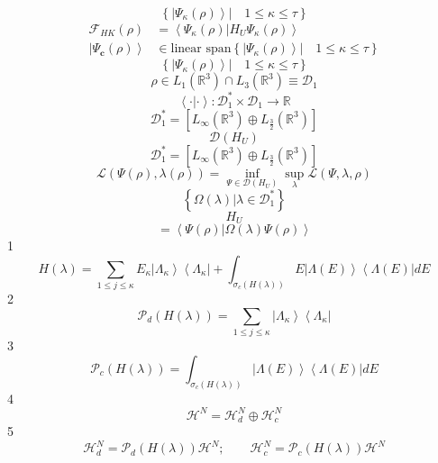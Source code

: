\documentclass[prl,twocolumn]{revtex4}%
\begin{document}
\[
\left\{  \left.  \left\vert \Psi_{\kappa}\left(  \rho\right)  \right\rangle
\right\vert \quad1\leq\kappa\leq\tau\right\}
\]%
\begin{align*}
\mathcal{F}_{HK}\left(  \rho\right)   &  =\left\langle \Psi_{\kappa}\left(
\rho\right)  \left\vert H_{U}\right.  \Psi_{\kappa}\left(  \rho\right)
\right\rangle \\
\left\vert \Psi_{\mathbf{c}}\left(  \rho\right)  \right\rangle  &
\in\text{linear span}\left\{  \left.  \left\vert \Psi_{\kappa}\left(
\rho\right)  \right\rangle \right\vert \quad1\leq\kappa\leq\tau\right\}
\end{align*}%
\[
\left\{  \left.  \left\vert \Psi_{\kappa}\left(  \rho\right)  \right\rangle
\right\vert \quad1\leq\kappa\leq\tau\right\}
\]%
\[
\rho\in L_{1}\left(  \mathbb{R}^{3}\right)  \cap L_{3}\left(  \mathbb{R}%
^{3}\right)  \equiv\mathcal{D}_{1}%
\]%
\[
\left\langle \cdot|\cdot\right\rangle :\mathcal{D}_{1}^{\ast}\times
\mathcal{D}_{1}\rightarrow\mathbb{R}%
\]%
\[
\mathcal{D}_{1}^{\ast}=\left[  L_{\infty}\left(  \mathbb{R}^{3}\right)  \oplus
L_{\frac{3}{2}}\left(  \mathbb{R}^{3}\right)  \right]
\]%
\[
\mathcal{D}\left(  H_{U}\right)
\]%
\[
\mathcal{D}_{1}^{\ast}=\left[  L_{\infty}\left(  \mathbb{R}^{3}\right)  \oplus
L_{\frac{3}{2}}\left(  \mathbb{R}^{3}\right)  \right]
\]%
\[
\mathcal{L}\left(  \Psi\left(  \rho\right)  ,\lambda\left(  \rho\right)
\right)  =\inf_{\Psi\in\mathcal{D}\left(  H_{U}\right)  }\sup_{\lambda
}\mathcal{L}\left(  \Psi,\lambda,\rho\right)
\]%
\[
\left\{  \left.  \Omega\left(  \lambda\right)  \right\vert \lambda
\in\mathcal{D}_{1}^{\ast}\right\}
\]%
\[
H_{U}%
\]%
\[
=\left\langle \left.  \Psi\left(  \rho\right)  \right\vert \Omega\left(
\lambda\right)  \Psi\left(  \rho\right)  \right\rangle
\]
1%
\[
H\left(  \lambda\right)  =\sum_{1\leq j\leq\kappa}E_{\kappa}\left\vert
\Lambda_{\kappa}\right\rangle \left\langle \Lambda_{\kappa}\right\vert
+\int_{\sigma_{c}\left(  H\left(  \lambda\right)  \right)  }E\left\vert
\Lambda\left(  E\right)  \right\rangle \left\langle \Lambda\left(  E\right)
\right\vert dE
\]
2%
\[
\mathcal{P}_{d}\left(  H\left(  \lambda\right)  \right)  =\sum_{1\leq
j\leq\kappa}\left\vert \Lambda_{\kappa}\right\rangle \left\langle
\Lambda_{\kappa}\right\vert
\]
3%
\[
\mathcal{P}_{c}\left(  H\left(  \lambda\right)  \right)  =\int_{\sigma
_{c}\left(  H\left(  \lambda\right)  \right)  }\left\vert \Lambda\left(
E\right)  \right\rangle \left\langle \Lambda\left(  E\right)  \right\vert dE
\]
4%
\[
\mathcal{H}^{N}=\mathcal{H}_{d}^{N}\oplus\mathcal{H}_{c}^{N}%
\]
5%
\[
\mathcal{H}_{d}^{N}=\mathcal{P}_{d}\left(  H\left(  \lambda\right)  \right)
\mathcal{H}^{N};\qquad\mathcal{H}_{c}^{N}=\mathcal{P}_{c}\left(  H\left(
\lambda\right)  \right)  \mathcal{H}^{N}%
\]
\end{document}
